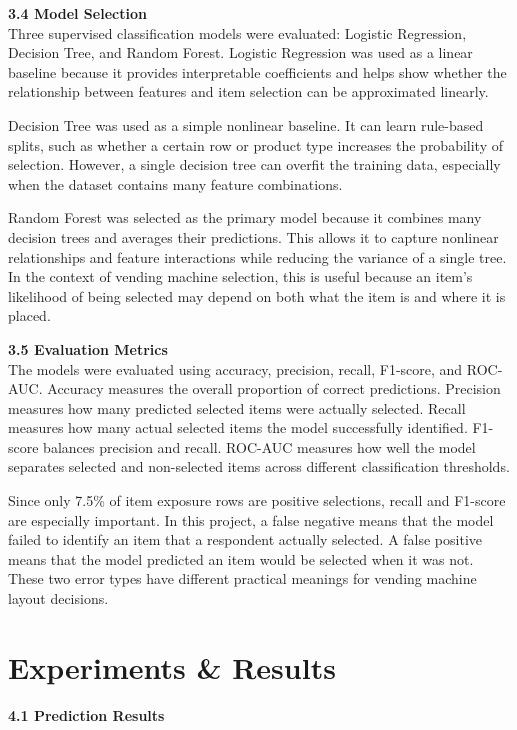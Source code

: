\documentclass{article}
\begin{document}
\textbf{3.4 Model Selection} \\

Three supervised classification models were evaluated: Logistic Regression, Decision Tree, and Random Forest. Logistic Regression was used as a linear baseline because it provides interpretable coefficients and helps show whether the relationship between features and item selection can be approximated linearly.

Decision Tree was used as a simple nonlinear baseline. It can learn rule-based splits, such as whether a certain row or product type increases the probability of selection. However, a single decision tree can overfit the training data, especially when the dataset contains many feature combinations.

Random Forest was selected as the primary model because it combines many decision trees and averages their predictions. This allows it to capture nonlinear relationships and feature interactions while reducing the variance of a single tree. In the context of vending machine selection, this is useful because an item's likelihood of being selected may depend on both what the item is and where it is placed.

\textbf{3.5 Evaluation Metrics} \\

The models were evaluated using accuracy, precision, recall, F1-score, and ROC-AUC. Accuracy measures the overall proportion of correct predictions. Precision measures how many predicted selected items were actually selected. Recall measures how many actual selected items the model successfully identified. F1-score balances precision and recall. ROC-AUC measures how well the model separates selected and non-selected items across different classification thresholds.

Since only 7.5\% of item exposure rows are positive selections, recall and F1-score are especially important. In this project, a false negative means that the model failed to identify an item that a respondent actually selected. A false positive means that the model predicted an item would be selected when it was not. These two error types have different practical meanings for vending machine layout decisions.
\section{Experiments \& Results}

\textbf{4.1 Prediction Results} \\
\end{document}
